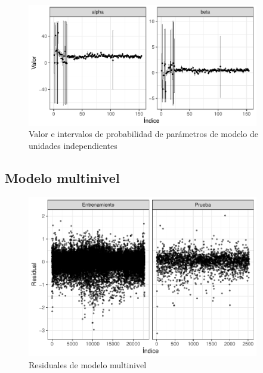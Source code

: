 \begin{figure}[H]
    \centering
    \includegraphics[width=0.9\textwidth]{images/no_pooling_param_values.pdf}
    \caption{Valor e intervalos de probabilidad de parámetros de modelo de unidades independientes}
    \label{fig:no_pooling_param_values}
\end{figure}


\subsection{Modelo multinivel}



\begin{figure}[H]
    \centering
    \includegraphics[width=0.9\textwidth]{images/three_levels_resids.pdf}
    \caption{Residuales de modelo multinivel}
    \label{fig:three_levels_resids}
\end{figure}

